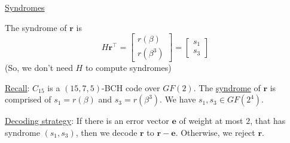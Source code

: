 \underline{Syndromes}

The syndrome of $ \symbf{r} $ is
\[ H\symbf{r}^\top=
    \begin{bmatrix}
        r(\beta) \\
        r(\beta^3)
    \end{bmatrix}=
    \begin{bmatrix}
        s_1 \\
        s_3
    \end{bmatrix} \]
(So, we don't need $ H $ to compute syndromes)

\underline{Recall}: $ C_{15} $ is a $ (15,7,5) $-BCH code over $ GF(2) $.
The \underline{syndrome} of $ \symbf{r} $ is comprised of $ s_1=r(\beta) $
and $ s_3=r(\beta^3) $. We have $ s_1,s_3\in GF(2^4) $.

\underline{Decoding strategy}: If there is an error vector $ \symbf{e} $
of weight at most $ 2 $, that has syndrome $ (s_1,s_3) $, then we decode
$ \symbf{r} $ to $ \symbf{r}-\symbf{e} $. Otherwise, we reject $ \symbf{r} $.

